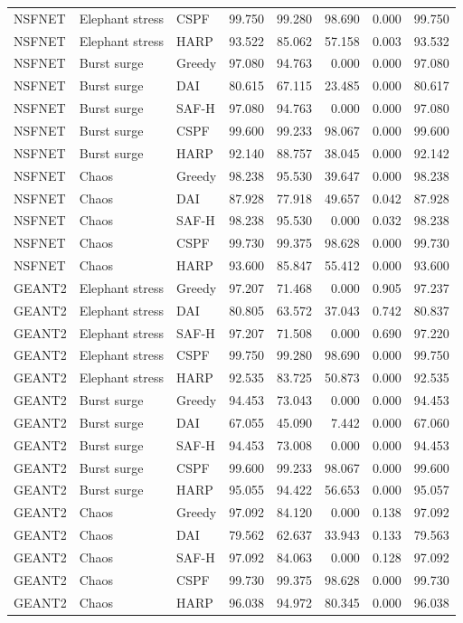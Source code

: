 \documentclass[final,5p]{elsarticle}
\begin{document}
\begin{table}[p]
\begin{tabular}{lllrrrrr}
NSFNET & Elephant stress & CSPF & 99.750 & 99.280 & 98.690 & 0.000 & 99.750 \\
NSFNET & Elephant stress & HARP & 93.522 & 85.062 & 57.158 & 0.003 & 93.532 \\
NSFNET & Burst surge & Greedy & 97.080 & 94.763 & 0.000 & 0.000 & 97.080 \\
NSFNET & Burst surge & DAI & 80.615 & 67.115 & 23.485 & 0.000 & 80.617 \\
NSFNET & Burst surge & SAF-H & 97.080 & 94.763 & 0.000 & 0.000 & 97.080 \\
NSFNET & Burst surge & CSPF & 99.600 & 99.233 & 98.067 & 0.000 & 99.600 \\
NSFNET & Burst surge & HARP & 92.140 & 88.757 & 38.045 & 0.000 & 92.142 \\
NSFNET & Chaos & Greedy & 98.238 & 95.530 & 39.647 & 0.000 & 98.238 \\
NSFNET & Chaos & DAI & 87.928 & 77.918 & 49.657 & 0.042 & 87.928 \\
NSFNET & Chaos & SAF-H & 98.238 & 95.530 & 0.000 & 0.032 & 98.238 \\
NSFNET & Chaos & CSPF & 99.730 & 99.375 & 98.628 & 0.000 & 99.730 \\
NSFNET & Chaos & HARP & 93.600 & 85.847 & 55.412 & 0.000 & 93.600 \\
GEANT2 & Elephant stress & Greedy & 97.207 & 71.468 & 0.000 & 0.905 & 97.237 \\
GEANT2 & Elephant stress & DAI & 80.805 & 63.572 & 37.043 & 0.742 & 80.837 \\
GEANT2 & Elephant stress & SAF-H & 97.207 & 71.508 & 0.000 & 0.690 & 97.220 \\
GEANT2 & Elephant stress & CSPF & 99.750 & 99.280 & 98.690 & 0.000 & 99.750 \\
GEANT2 & Elephant stress & HARP & 92.535 & 83.725 & 50.873 & 0.000 & 92.535 \\
GEANT2 & Burst surge & Greedy & 94.453 & 73.043 & 0.000 & 0.000 & 94.453 \\
GEANT2 & Burst surge & DAI & 67.055 & 45.090 & 7.442 & 0.000 & 67.060 \\
GEANT2 & Burst surge & SAF-H & 94.453 & 73.008 & 0.000 & 0.000 & 94.453 \\
GEANT2 & Burst surge & CSPF & 99.600 & 99.233 & 98.067 & 0.000 & 99.600 \\
GEANT2 & Burst surge & HARP & 95.055 & 94.422 & 56.653 & 0.000 & 95.057 \\
GEANT2 & Chaos & Greedy & 97.092 & 84.120 & 0.000 & 0.138 & 97.092 \\
GEANT2 & Chaos & DAI & 79.562 & 62.637 & 33.943 & 0.133 & 79.563 \\
GEANT2 & Chaos & SAF-H & 97.092 & 84.063 & 0.000 & 0.128 & 97.092 \\
GEANT2 & Chaos & CSPF & 99.730 & 99.375 & 98.628 & 0.000 & 99.730 \\
GEANT2 & Chaos & HARP & 96.038 & 94.972 & 80.345 & 0.000 & 96.038 \\

\bottomrule
\end{tabular}
\end{table}
\end{document}

